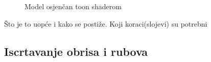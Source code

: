 \begin{figure}[H]
\caption{Model osjenčan toon shaderom}
\label{fig:monkey-toonshaded}
\begin{center}
\end{center}
\end{figure}

Što je to uopće i kako se postiže. Koji koraci(slojevi) su potrebni

\subsection{Iscrtavanje obrisa i rubova}

